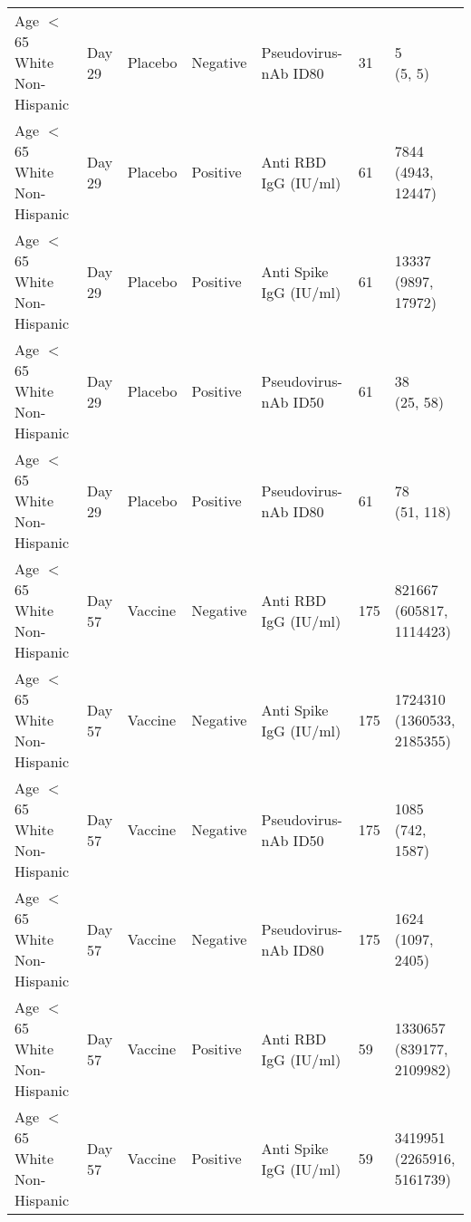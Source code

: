 \documentclass[]{book}
\theoremstyle{definition}
\theoremstyle{definition}
\theoremstyle{definition}
\newcommand{\1}{\mathbbm{1}}
\begin{document}
\begin{landscape}
\begin{ThreePartTable}
\begin{longtable}[t]{>{\raggedright\arraybackslash}p{7cm}llllll}
\hspace{1em}Age $<$ 65 White Non-Hispanic & Day 29 & Placebo & Negative & Pseudovirus-nAb ID80 & 31 & \makecell[l]{5\\(5, 5)}\\
\hspace{1em}Age $<$ 65 White Non-Hispanic & Day 29 & Placebo & Positive & Anti RBD IgG (IU/ml) & 61 & \makecell[l]{7844\\(4943, 12447)}\\
\hspace{1em}Age $<$ 65 White Non-Hispanic & Day 29 & Placebo & Positive & Anti Spike IgG (IU/ml) & 61 & \makecell[l]{13337\\(9897, 17972)}\\
\hspace{1em}Age $<$ 65 White Non-Hispanic & Day 29 & Placebo & Positive & Pseudovirus-nAb ID50 & 61 & \makecell[l]{38\\(25, 58)}\\
\hspace{1em}Age $<$ 65 White Non-Hispanic & Day 29 & Placebo & Positive & Pseudovirus-nAb ID80 & 61 & \makecell[l]{78\\(51, 118)}\\
\hspace{1em}Age $<$ 65 White Non-Hispanic & Day 57 & Vaccine & Negative & Anti RBD IgG (IU/ml) & 175 & \makecell[l]{821667\\(605817, 1114423)}\\
\hspace{1em}Age $<$ 65 White Non-Hispanic & Day 57 & Vaccine & Negative & Anti Spike IgG (IU/ml) & 175 & \makecell[l]{1724310\\(1360533, 2185355)}\\
\hspace{1em}Age $<$ 65 White Non-Hispanic & Day 57 & Vaccine & Negative & Pseudovirus-nAb ID50 & 175 & \makecell[l]{1085\\(742, 1587)}\\
\hspace{1em}Age $<$ 65 White Non-Hispanic & Day 57 & Vaccine & Negative & Pseudovirus-nAb ID80 & 175 & \makecell[l]{1624\\(1097, 2405)}\\
\hspace{1em}Age $<$ 65 White Non-Hispanic & Day 57 & Vaccine & Positive & Anti RBD IgG (IU/ml) & 59 & \makecell[l]{1330657\\(839177, 2109982)}\\
\hspace{1em}Age $<$ 65 White Non-Hispanic & Day 57 & Vaccine & Positive & Anti Spike IgG (IU/ml) & 59 & \makecell[l]{3419951\\(2265916, 5161739)}\\

\end{longtable}
\end{ThreePartTable}
\end{landscape}
\end{document}
